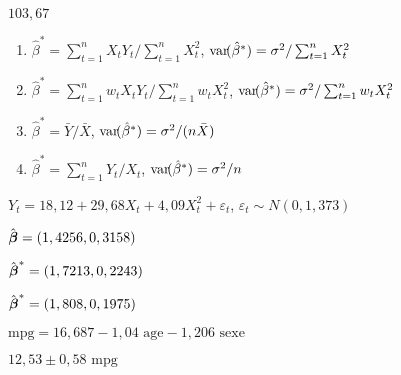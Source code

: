 \begin{reponse}{3.12}
    $103,67$
  
\end{reponse}
\begin{reponse}{3.15}
    \begin{enumerate}
    \item $\hat{\beta}^* = \sum_{t=1}^n X_t Y_t/\sum_{t=1}^n X_t^2$,
      $\mathrm{var}\! ( \hat{\beta}^* ) = \sigma^2/\sum_{t=1}^n X_t^2$
    \item $\hat{\beta}^* = \sum_{t=1}^n w_t X_t Y_t/\sum_{t=1}^n
      w_t X_t^2$,
      $\mathrm{var}\! ( \hat{\beta}^* ) = \sigma^2/\sum_{t=1}^n w_t X_t^2$
    \item $\hat{\beta}^* = \bar{Y}/\bar{X}$,
      $\mathrm{var}\! ( \hat{\beta}^* ) = \sigma^2/(n \bar{X})$
    \item $\hat{\beta}^* = \sum_{t=1}^n Y_t/X_t$,
      $\mathrm{var}\! ( \hat{\beta}^* ) = \sigma^2/n$
    \end{enumerate}
  
\end{reponse}
\begin{reponse}{3.16}
    $Y_t = 18,12 +
    29,68 X_t +
    4,09 X_t^2 + \varepsilon_t$,
    $\varepsilon_t \sim N(0, 1,373)$
  
\end{reponse}
\begin{reponse}{3.17}
    \begin{inparaenum}
    \item $\hat\betavec = (%
      1,4256,
      0,3158)$
    \item $\hat\betavec^* = (%
      1,7213,
      0,2243)$
    \item $\hat\betavec^* = (%
      1,808,
      0,1975)$
    \end{inparaenum}
  
\end{reponse}
\begin{reponse}{3.18}
    \begin{inparaenum}
    \item $\text{mpg} = %
      16,687
      -1,04 \text{ age}
      -1,206 \text{ sexe}$
    \item $12,53 \pm
      0,58 \text{ mpg}$
    \end{inparaenum}
  
\end{reponse}
